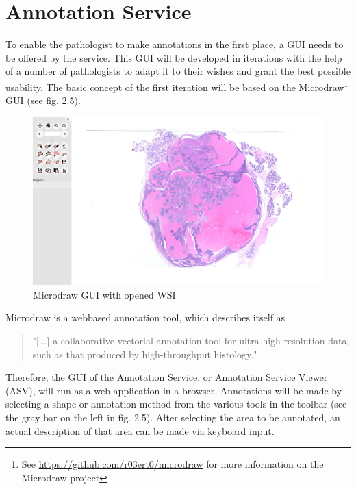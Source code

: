 \chapter{Annotation Service}

To enable the pathologist to make annotations in the first place, a GUI needs to be offered by the service. This GUI will be developed in iterations with the help of a number of pathologists to adapt it to their wishes and grant the best possible usability. The basic concept of the first iteration will be based on the Microdraw\footnote{See \url{https://github.com/r03ert0/microdraw} for more information on the Microdraw project} GUI (see fig. 2.5).

\begin{figure}[H]
	\begin{center}
		\includegraphics[scale=0.2]{img/microdrawUI.png}
		\caption{Microdraw GUI with opened WSI}
		\label{fig:fig2.5}
	\end{center}
\end{figure}

Microdraw is a webbased annotation tool, which describes itself as

\begin{quotation}
	"[...] a collaborative vectorial annotation tool for ultra high resolution data, such as that produced by high-throughput histology." \cite{web:microdraw}
\end{quotation}

Therefore, the GUI of the Annotation Service, or Annotation Service Viewer (ASV), will run as a web application in a browser. Annotations will be made by selecting a shape or annotation method from the various tools in the toolbar (see the gray bar on the left in fig. 2.5). After selecting the area to be annotated, an actual description of that area can be made via keyboard input.

